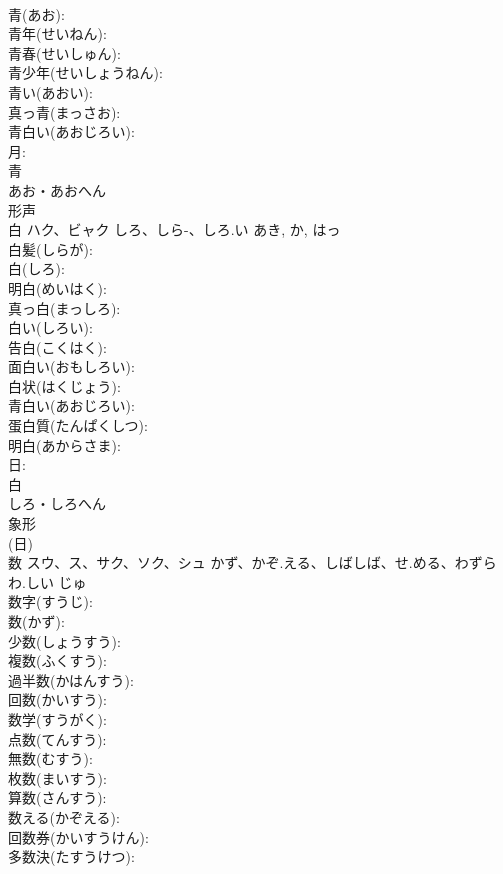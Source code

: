 \documentclass[8pt]{extreport}
\begin{document}
\begin{CJK}{UTF8}{min}
\\	青(あお): 
\\	青年(せいねん): 
\\	青春(せいしゅん): 
\\	青少年(せいしょうねん): 
\\	青い(あおい): 
\\	真っ青(まっさお): 
\\	青白い(あおじろい): 
\\	月: 
\\	青	
\\	あお・あおへん	
\\	形声 
\\	白	ハク、ビャク	しろ、しら-、しろ.い	あき, か, はっ	
\\	白髪(しらが): 
\\	白(しろ): 
\\	明白(めいはく): 
\\	真っ白(まっしろ): 
\\	白い(しろい): 
\\	告白(こくはく): 
\\	面白い(おもしろい): 
\\	白状(はくじょう): 
\\	青白い(あおじろい): 
\\	蛋白質(たんぱくしつ): 
\\	明白(あからさま): 
\\	日: 
\\	白	
\\	しろ・しろへん	
\\	象形 
\\	(日) 
\\	数	スウ、ス、サク、ソク、シュ	かず、かぞ.える、しばしば、せ.める、わずらわ.しい	じゅ	
\\	数字(すうじ): 
\\	数(かず): 
\\	少数(しょうすう): 
\\	複数(ふくすう): 
\\	過半数(かはんすう): 
\\	回数(かいすう): 
\\	数学(すうがく): 
\\	点数(てんすう): 
\\	無数(むすう): 
\\	枚数(まいすう): 
\\	算数(さんすう): 
\\	数える(かぞえる): 
\\	回数券(かいすうけん): 
\\	多数決(たすうけつ): 

\end{CJK}
\end{document}
